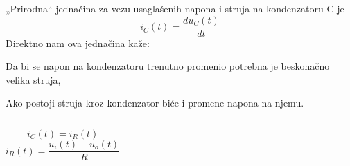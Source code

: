 \begin{frame}[label=08-s042]
\setlength{\parskip}{2pt}
\setlength{\abovedisplayskip}{4pt}\setlength{\belowdisplayskip}{4pt}
\gusttekst
„Prirodna“ jednačina za vezu usaglašenih napona i struja na kondenzatoru C je
\[i_C(t)=\frac{du_C(t)}{dt}\]
Direktno nam ova jednačina kaže:\par
\hspace{4mm}Da bi se napon na kondenzatoru trenutno promenio potrebna je beskonačno velika struja,\par
\hspace{4mm}Ako postoji struja kroz kondenzator biće i promene napona na njemu.\par\bigskip
\begin{columns}[c,onlytextwidth]\centering
{}
\[i_C(t)=i_R(t)\]
\[i_R(t)=\frac{u_i(t)-u_o(t)}R\]
\end{columns}
\end{frame}
